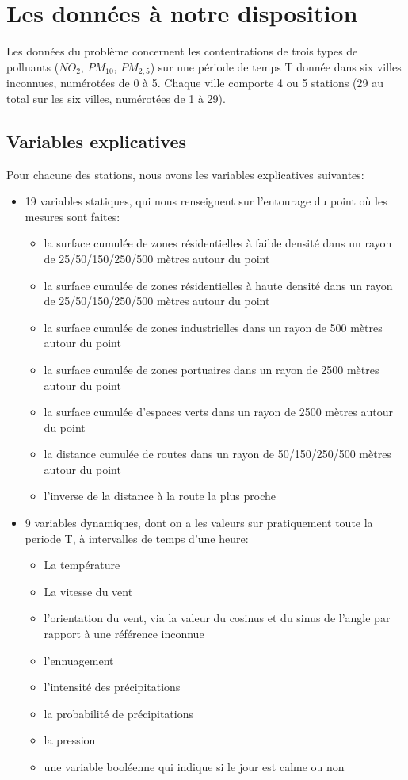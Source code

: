 \section{Les données à notre disposition}

Les données du problème concernent les contentrations de trois types de polluants ($NO_2$, $PM_{10}$, $PM_{2,5}$) sur une période de temps T donnée dans six villes inconnues, numérotées de 0 à 5.
Chaque ville comporte 4 ou 5 stations (29 au total sur les six villes, numérotées de 1 à 29).

\subsection{Variables explicatives}

Pour chacune des stations, nous avons les variables explicatives suivantes:
\begin{itemize}
  \item 19 variables statiques, qui nous renseignent sur l'entourage du point où les mesures sont faites:
  \begin{itemize}
    \item la surface cumulée de zones résidentielles à faible densité dans un rayon de 25/50/150/250/500 mètres autour du point
    \item la surface cumulée de zones résidentielles à haute densité dans un rayon de 25/50/150/250/500 mètres autour du point
    \item la surface cumulée de zones industrielles dans un rayon de 500 mètres autour du point
    \item la surface cumulée de zones portuaires dans un rayon de 2500 mètres autour du point
    \item la surface cumulée d'espaces verts dans un rayon de 2500 mètres autour du point
    \item la distance cumulée de routes dans un rayon de 50/150/250/500 mètres autour du point
    \item l'inverse de la distance à la route la plus proche
  \end{itemize}
  \item 9 variables dynamiques, dont on a les valeurs sur pratiquement toute la periode T, à intervalles de temps d'une heure:
  \begin{itemize}
    \item La température
    \item La vitesse du vent
    \item l'orientation du vent, via la valeur du cosinus et du sinus de l'angle par rapport à une référence inconnue
    \item l'ennuagement
    \item l'intensité des précipitations
    \item la probabilité de précipitations
    \item la pression
    \item une variable booléenne qui indique si le jour est calme ou non
  \end{itemize}
\end{itemize}

